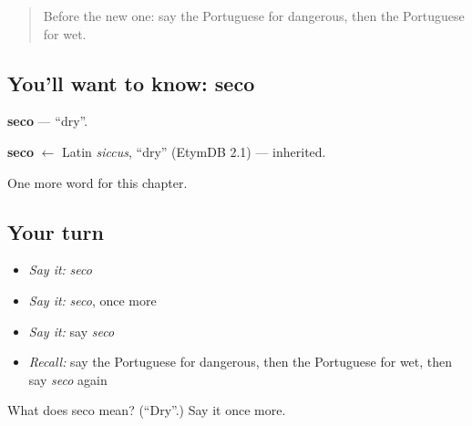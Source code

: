 \begin{quote}
Before the new one: say the Portuguese for dangerous, then the Portuguese for wet.
\end{quote}

\subsection*{You'll want to know: seco}
\textbf{seco} — \textquotedblleft{}dry\textquotedblright{}.

\begin{cousinweb}
\textbf{seco} $\leftarrow$ Latin \emph{siccus}, \textquotedblleft{}dry\textquotedblright{} (EtymDB 2.1) — inherited.
\end{cousinweb}

\begin{grammarlens}[title={What you've built}]
One more word for this chapter.
\end{grammarlens}

\subsection*{Your turn}
\begin{itemize}
\raggedright
  \item \emph{Say it:} \emph{seco}
  \item \emph{Say it:} \emph{seco}, once more
  \item \emph{Say it:} say \emph{seco}
  \item \emph{Recall:} say the Portuguese for dangerous, then the Portuguese for wet, then say \emph{seco} again
\end{itemize}

\begin{tcolorbox}[breakable,colback=teal!4,colframe=teal!35!black,title={Before you move on}]
What does seco mean? (\textquotedblleft{}Dry\textquotedblright{}.) Say it once more.
\end{tcolorbox}
